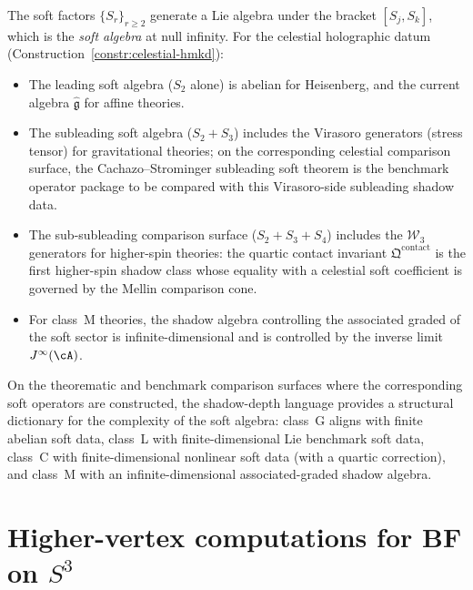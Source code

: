 \begin{remark}
The soft factors $\{S_r\}_{r \geq 2}$ generate a Lie algebra under the bracket
$[S_j, S_k]$, which is the \emph{soft algebra} at null infinity. For the celestial
holographic datum (Construction~\ref{constr:celestial-hmkd}):
\begin{itemize}
\item The leading soft algebra ($S_2$ alone) is abelian for Heisenberg, and the
 current algebra $\widehat{\mathfrak{g}}$ for affine theories.
\item The subleading soft algebra ($S_2 + S_3$) includes the Virasoro generators
 (stress tensor) for gravitational theories; on the corresponding
 celestial comparison surface, the Cachazo--Strominger subleading
 soft theorem is the benchmark operator package to be compared with
 this Virasoro-side subleading shadow data.
\item The sub-subleading comparison surface ($S_2 + S_3 + S_4$) includes
 the $\mathcal{W}_3$ generators for higher-spin theories: the quartic
 contact invariant $\mathfrak{Q}^{\mathrm{contact}}$ is the first
 higher-spin shadow class whose equality with a celestial soft
 coefficient is governed by the Mellin comparison cone.
\item For class~M theories, the shadow algebra controlling the associated
 graded of the soft sector is infinite-dimensional and is controlled by
 the inverse limit $J^\infty(\cA)$.
\end{itemize}
On the theorematic and benchmark comparison surfaces where the corresponding soft
operators are constructed, the shadow-depth language provides a
structural dictionary for the complexity of the soft algebra: class~G aligns
with finite abelian soft data, class~L with finite-dimensional Lie benchmark
soft data, class~C with finite-dimensional nonlinear soft data (with a quartic
correction), and class~M with an infinite-dimensional associated-graded
shadow algebra.
\end{remark}



\section{Higher-vertex computations for BF on $S^3$}

